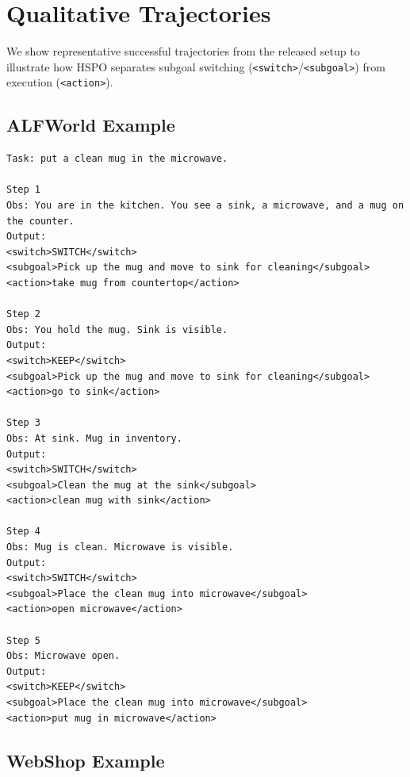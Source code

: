 \documentclass{article}
\begin{document}
\section{Qualitative Trajectories}
\label{app:qualitative}

We show representative successful trajectories from the released setup to illustrate how HSPO separates subgoal switching (\texttt{<switch>}/\texttt{<subgoal>}) from execution (\texttt{<action>}).

\subsection{ALFWorld Example}
\label{app:alfworld_trajectory}

\begin{lstlisting}
Task: put a clean mug in the microwave.

Step 1
Obs: You are in the kitchen. You see a sink, a microwave, and a mug on the counter.
Output:
<switch>SWITCH</switch>
<subgoal>Pick up the mug and move to sink for cleaning</subgoal>
<action>take mug from countertop</action>

Step 2
Obs: You hold the mug. Sink is visible.
Output:
<switch>KEEP</switch>
<subgoal>Pick up the mug and move to sink for cleaning</subgoal>
<action>go to sink</action>

Step 3
Obs: At sink. Mug in inventory.
Output:
<switch>SWITCH</switch>
<subgoal>Clean the mug at the sink</subgoal>
<action>clean mug with sink</action>

Step 4
Obs: Mug is clean. Microwave is visible.
Output:
<switch>SWITCH</switch>
<subgoal>Place the clean mug into microwave</subgoal>
<action>open microwave</action>

Step 5
Obs: Microwave open.
Output:
<switch>KEEP</switch>
<subgoal>Place the clean mug into microwave</subgoal>
<action>put mug in microwave</action>
\end{lstlisting}

\subsection{WebShop Example}
\label{app:webshop_trajectory}
\end{document}
